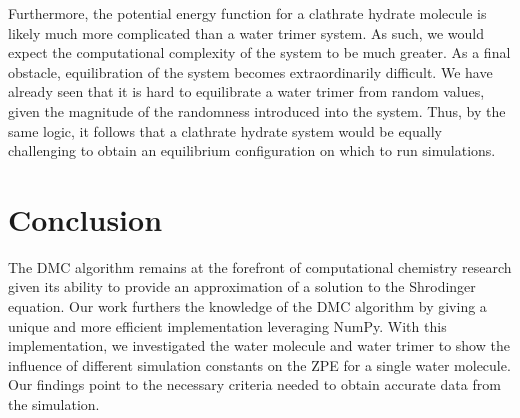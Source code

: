 \documentclass[journal=jacsat,manuscript=article]{achemso}
\begin{document}
Furthermore, the potential energy function for a clathrate hydrate molecule is likely much more complicated than a water trimer system. As such, we would expect the computational complexity of the system to be much greater. As a final obstacle, equilibration of the system becomes extraordinarily difficult. We have already seen that it is hard to equilibrate a water trimer from random values, given the magnitude of the randomness introduced into the system. Thus, by the same logic, it follows that a clathrate hydrate system would be equally challenging to obtain an equilibrium configuration on which to run simulations.

\section{Conclusion}

The DMC algorithm remains at the forefront of computational chemistry research given its ability to provide an approximation of a solution to the Shrodinger equation. Our work furthers the knowledge of the DMC algorithm by giving a unique and more efficient implementation leveraging NumPy. With this implementation, we investigated the water molecule and water trimer to show the influence of different simulation constants on the ZPE for a single water molecule. Our findings point to the necessary criteria needed to obtain accurate data from the simulation. 



\end{document}
